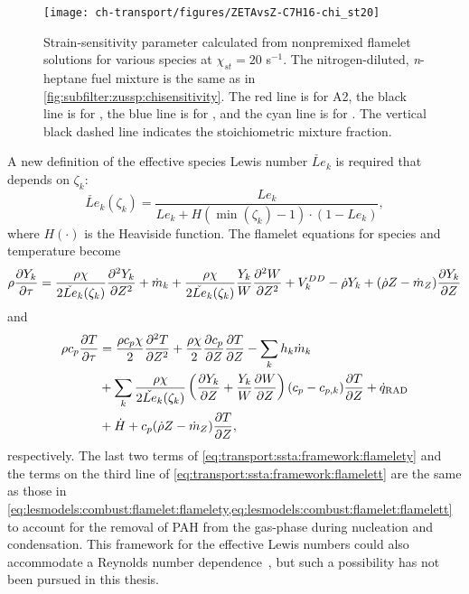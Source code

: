 \begin{figure}[htb]
  \centering
  \texttt{[image: ch-transport/figures/ZETAvsZ-C7H16-chi\_st20]}
  \caption[Strain-Sensitivity Parameter \texorpdfstring{$\zeta_k$}{Zk} for Various Species Within a / Mixture]{Strain-sensitivity parameter calculated from nonpremixed flamelet solutions for various species at $\chi_{st} = 20$ s$^{-1}$. The nitrogen-diluted, \textit{n}-heptane fuel mixture is the same as in \cref{fig:subfilter:zussp:chisensitivity}. The red line is for A2, the black line is for , the blue line is for , and the cyan line is for . The vertical black dashed line indicates the stoichiometric mixture fraction.}
  \label{fig:transport:ssta:framework:sspc7h16}
\end{figure}

A new definition of the effective species Lewis number $\check{Le}_k$ is required that depends on $\zeta_k$:
\begin{equation}\label{eq:transport:ssta:framework:lezetai}
  \check{Le}_k(\zeta_k) = \frac{Le_k}{Le_k + H(\min(\zeta_k) - 1)\cdot (1 - Le_k)},
\end{equation}
where $H(\cdot)$ is the Heaviside function. The flamelet equations for species and temperature become
\begin{equation}\label{eq:transport:ssta:framework:flamelety}
  \rho\pder[Y_k]{\tau} = \frac{\rho\chi}{2 \check{Le}_k(\zeta_k)}\sder[Y_k]{Z} + \dot{m}_k + \frac{\rho\chi}{2 \check{Le}_k(\zeta_k)}\frac{Y_k}{W}\sder[W]{Z} + V_k^{DD} - \dot{\rho}Y_k + (\dot{\rho}Z - \dot{m}_Z)\pder[Y_k]{Z}
\end{equation}
and
\begin{equation}\label{eq:transport:ssta:framework:flamelett}
  \begin{split}
    \rho c_p \pder[T]{\tau} &= \frac{\rho c_p \chi}{2}\sder[T]{Z} + \frac{\rho\chi}{2}\pder[c_p]{Z}\pder[T]{Z} - \sum\limits_{k} h_k\dot{m}_k \\
    &+ \sum\limits_{k} \frac{\rho\chi}{2 \check{Le}_k(\zeta_k)}\left( \pder[Y_k]{Z} + \frac{Y_k}{W}\pder[W]{Z} \right)(c_p - c_{p,k})\pder[T]{Z} + \dot{q}_{\text{RAD}} \\
    &+ \dot{H} + c_p(\dot{\rho}Z - \dot{m}_Z)\pder[T]{Z},
  \end{split}
\end{equation}
respectively. The last two terms of \cref{eq:transport:ssta:framework:flamelety} and the terms on the third line of \cref{eq:transport:ssta:framework:flamelett} are the same as those in \cref{eq:lesmodels:combust:flamelet:flamelety,eq:lesmodels:combust:flamelet:flamelett} to account for the removal of PAH from the gas-phase during nucleation and condensation. This framework for the effective Lewis numbers could also accommodate a Reynolds number dependence~\cite{wang2016}, but such a possibility has not been pursued in this thesis.

